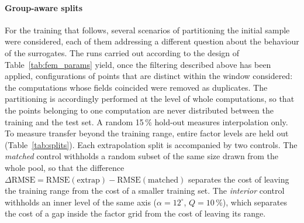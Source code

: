 \paragraph{Group-aware splits}
For the training that follows, several scenarios of partitioning the initial sample were considered, each of them addressing a different question about the behaviour of the surrogates.
The runs carried out according to the design of Table~\ref{tab:fem_params} yield, once the filtering described above has been applied, configurations of points that are distinct within the window considered: the computations whose fields coincided were removed as duplicates. The partitioning is accordingly performed at the level of whole computations, so that the points belonging to one computation are never distributed between the training and the test set. %
A random 15\,\% hold-out measures interpolation only. To measure transfer beyond the training range, entire factor levels are held out (Table~\ref{tab:splits}). %
Each extrapolation split is accompanied by two controls. The \emph{matched} control withholds a random subset of the same size drawn from the whole pool, so that the difference $\Delta\mathrm{RMSE} = \mathrm{RMSE}(\text{extrap}) - \mathrm{RMSE}(\text{matched})$ separates the cost of leaving the training range from the cost of a smaller training set. %
The \emph{interior} control withholds an inner level of the same axis ($\alpha = 12^\circ$, $Q = 10\,\%$), which separates the cost of a gap inside the factor grid from the cost of leaving its range. %
